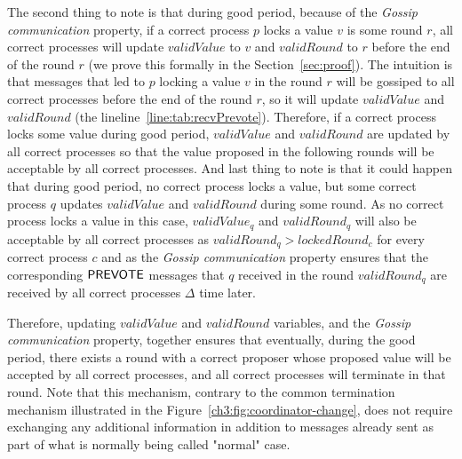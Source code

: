 The second thing to note is that during good period, because of the \emph{Gossip communication} property, if a correct process $p$ locks a value $v$ is some round $r$, all correct processes will update $validValue$ to $v$ and $validRound$ to $r$ before the end of the round $r$ (we prove this formally in the Section~\ref{sec:proof}). The intuition is that messages that led to $p$ locking a value $v$ in the round $r$ will be gossiped to all correct processes before the end of the round $r$, so it will update $validValue$ and $validRound$ (the lineline~\ref{line:tab:recvPrevote}). Therefore, if a correct process locks some value during good period, $validValue$ and $validRound$ are updated by all correct processes so that the value proposed in the following rounds will be acceptable by all correct processes. And last thing to note is that it could happen that during good period, no correct process locks a value, but some correct process $q$ updates $validValue$ and $validRound$ during some round. As no correct process locks a value in this case, $validValue_q$ and $validRound_q$ will also be acceptable by all correct processes as $validRound_q > lockedRound_c$ for every correct process $c$ and as the \emph{Gossip communication} property ensures that the corresponding $\mathsf{PREVOTE}$ messages that $q$ received in the round $validRound_q$ are received by all correct processes $\Delta$ time later. 

Therefore, updating $validValue$ and $validRound$ variables, and the \emph{Gossip communication} property, together ensures that eventually, during the good period, there exists a round with a correct proposer whose proposed value will be accepted by all correct processes, and all correct processes will terminate in that round. Note that this mechanism, contrary to the common termination mechanism illustrated in the Figure~\ref{ch3:fig:coordinator-change}, does not require exchanging any additional information in addition to messages already sent as part of what is normally being called "normal" case.     
